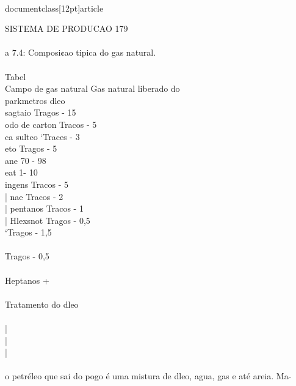 \\documentclass[12pt]{article}
\begin{document}
{SISTEMA DE PRODUCAO 179\\
\\
a 7.4: Composi¢ao tipica do gas natural.\\
\\
Tabel\\
Campo de gas natural Gas natural liberado do\\
parkmetros dleo\\
sagtaio Tragos - 15\\%
odo de carton Tracos - 5\\%
ca sultco ‘Traces - 3\\%
eto Tragos - 5\\%
ane 70 - 98\\%
eat 1- 10\\%
ingens Tracos - 5\\%
| nae Tracos - 2\\%
| pentanos Tracos - 1\\%
| Hlexsnot Tragos - 0,5\\%
‘Tragos - 1,5\\%
\\
Tragos - 0,5\\%
\\
Heptanos +\\
\\
Tratamento do dleo\\
\\
|\\
|\\
|\\
\\} o petréleo que sai do pogo é uma mistura de dleo, agua, gas e até areia. Ma-\\
\end{document}
